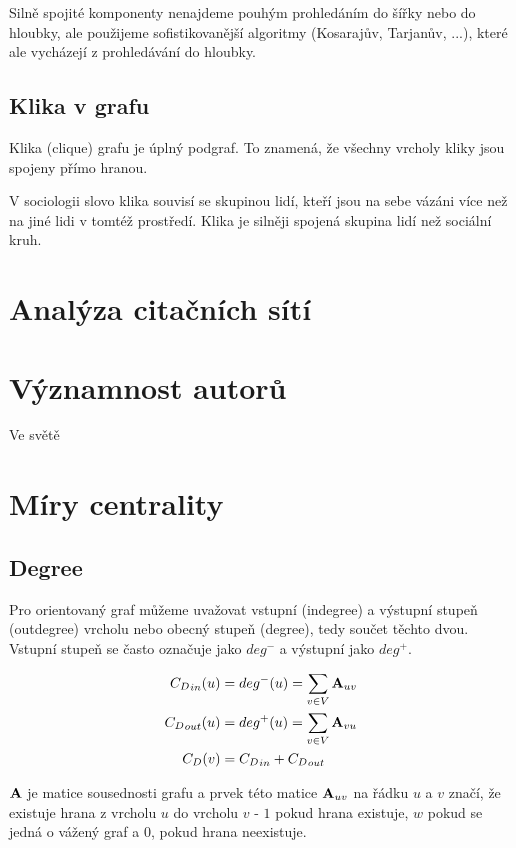 \documentclass[12pt,titlepage]{report}
\begin{document}
Silně spojité komponenty nenajdeme pouhým prohledáním do šířky nebo do hloubky,
ale použijeme sofistikovanější algoritmy (Kosarajův, Tarjanův, ...), které ale
vycházejí z prohledávání do hloubky.

\subsection{Klika v grafu}
Klika (clique) grafu je úplný podgraf. To znamená, že všechny vrcholy kliky
jsou spojeny přímo hranou.

V sociologii slovo klika souvisí se skupinou lidí, kteří jsou na sebe vázáni
více než na jiné lidi v tomtéž prostředí. Klika je silněji spojená skupina lidí
než sociální kruh.

\section{Analýza citačních sítí}
\section{Významnost autorů}
Ve světě

\section{Míry centrality}
\subsection{Degree}
Pro orientovaný graf můžeme uvažovat vstupní (indegree) a výstupní stupeň
(outdegree) vrcholu nebo obecný stupeň (degree), tedy součet těchto dvou.
Vstupní stupeň se často označuje jako $deg^-$ a výstupní jako $deg^+$.

\begin{align}
{C_D}_{in}(u) &= deg^-(u)  = \displaystyle\sum\limits_{v \in V} {\bf A}_{uv} \\
{C_D}_{out}(u) &= deg^+(u) = \displaystyle\sum\limits_{v \in V} {\bf A}_{vu} \\
{C_D}(v) &= {C_D}_{in} + {C_D}_{out} \\
\end{align}

${\bf A}$ je matice sousednosti grafu a prvek této matice ${\bf A}_{uv}$ na
řádku $u$ a $v$ značí, že existuje hrana z vrcholu $u$ do vrcholu $v$ - $1$
pokud hrana existuje, $w$ pokud se jedná o vážený graf a $0$, pokud hrana
neexistuje.
\end{document}
